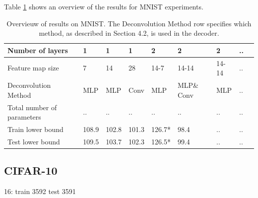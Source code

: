 Table \ref{overview} shows an overview of the results for MNIST experiments. 
\begin{table}
\caption{Overvieuw of results on MNIST. The Deconvolution Method row specifies which method, as described in Section 4.2, is used in the decoder.}
\renewcommand{\arraystretch}{1.5}
\label{overview}
\begin{tabular}{| l | l | l | l | l | l | l | l | l |}

	\hline
  Number of layers 					& 1 	 	& 1 		& 1 		& 2 		& 2 			& 2 		& .. \\ \hline
  Feature map size 					& 7 		& 14 	& 28 	& 14-7	& 14-14		& 14-14 	& .. \\ \hline
  Deconvolution Method 				& MLP 	& MLP	& Conv 	& MLP	& MLP\& Conv	& MLP	& ..	 \\ \hline
  Total number of parameters 		& .. 	& .. 	& ..		& ..		& ..			& .. 	& .. \\ \hline
  Train lower bound 					& 108.9 	& 102.8 	& 101.3 	& 126.7*	& 98.4			& ..		& .. \\ \hline
  Test lower bound 					& 109.5	& 103.7 	& 102.3 	& 126.5*	& 99.4		& ..		& .. \\ \hline
\end{tabular}
\end{table}


\subsection{CIFAR-10}

16: train 3592 test 3591\\






